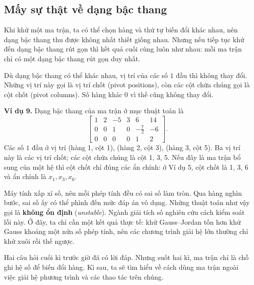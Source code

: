 \documentclass[12pt,a4paper]{article}
\begin{document}
\subsection{Mấy sự thật về dạng bậc thang}

Khi khử một ma trận, ta có thể chọn hàng và thứ tự biến đổi khác nhau, nên dạng bậc thang thu được không nhất thiết giống nhau.
Nhưng nếu tiếp tục khử đến dạng bậc thang rút gọn thì kết quả cuối cùng luôn như nhau: mỗi ma trận chỉ có một dạng bậc thang rút gọn duy nhất.

Dù dạng bậc thang có thể khác nhau, vị trí của các số \(1\) đầu thì không thay đổi. Những vị trí này gọi là vị trí chốt (pivot positions), còn các cột chứa chúng gọi là cột chốt (pivot columns). Số hàng khác \(0\) vì thế cũng không thay đổi.

\textbf{Ví dụ 9.} Dạng bậc thang của ma trận ở mục thuật toán là
$$
\left[ \begin{array}{ccccc|c} 1 & 2 & -5 & 3 & 6 & 14 \\ 0 & 0 & 1 & 0 & -\frac72 & -6 \\ 0 & 0 & 0 & 0 & 1 & 2 \end{array} \right].
$$
Các số \(1\) đầu ở vị trí (hàng 1, cột 1), (hàng 2, cột 3), (hàng 3, cột 5). Ba vị trí này là các vị trí chốt; các cột chứa chúng là cột 1, 3, 5. Nếu đây là ma trận bổ sung của một hệ thì cột chốt chỉ đúng các ẩn chính: ở Ví dụ 5, cột chốt là 1, 3, 6 và ẩn chính là \(x_1,x_3,x_6\).

Máy tính xấp xỉ số, nên mỗi phép tính đều có sai số làm tròn. Qua hàng nghìn bước, sai số ấy có thể phình đến mức đáp án vô dụng. Những thuật toán như vậy gọi là \textbf{không ổn định} (\emph{unstable}). Ngành giải tích số nghiên cứu cách kiểm soát lỗi này. Ở đây, ta chỉ cần một kết quả thực tế: khử Gauss--Jordan tốn hơn khử Gauss khoảng một nửa số phép tính, nên các chương trình giải hệ lớn thường chỉ khử xuôi rồi thế ngược.


Hai câu hỏi cuối kì trước giờ đã có lời đáp. Nhưng suốt hai kì, ma trận chỉ là chỗ ghi hệ số để biến đổi hàng. Kì sau, ta sẽ tìm hiểu về cách dùng ma trận ngoài việc giải hệ phương trình và các thao tác trên chúng.
\end{document}
